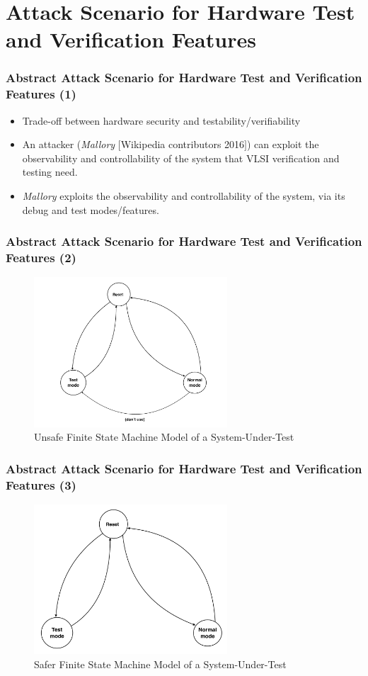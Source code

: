 \documentclass[xcolor={usenames,dvipsnames},hyperref={hyperindex,bookmarks}]{beamer}
\begin{document}
\section{Attack Scenario for Hardware Test and Verification Features}

\frame
{
	\frametitle{Abstract Attack Scenario for Hardware Test and Verification Features (1)}

	\begin{itemize}
	\item Trade-off between hardware security and testability/verifiability
	\item An attacker ({\it Mallory} $[$Wikipedia contributors 2016$]$) can exploit the observability and controllability of the system that VLSI verification and testing need.
	\item {\it Mallory} exploits the observability and controllability of the system, via its debug and test modes/features.
	\end{itemize}
}

\frame
{
	\frametitle{Abstract Attack Scenario for Hardware Test and Verification Features (2)}

\begin{figure}[h]
\centering 
\includegraphics[height=2.2in]{./pics/no_reset_soln}
\caption{Unsafe Finite State Machine Model of a System-Under-Test}
\label{fig:NoResetSolution}
\end{figure}

}


\frame
{
	\frametitle{Abstract Attack Scenario for Hardware Test and Verification Features (3)}

\begin{figure}[h]
\centering 
\includegraphics[height=2.2in]{./pics/reset_soln}
\caption{Safer Finite State Machine Model of a System-Under-Test}
\label{fig:ResetSolution}
\end{figure}

}
\end{document}
